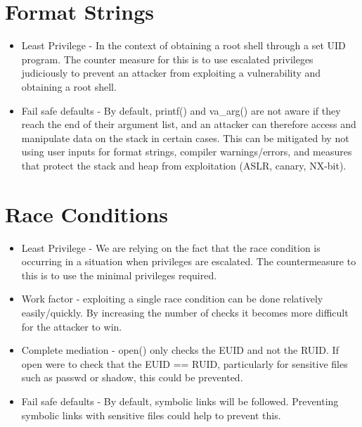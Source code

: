 \documentclass[12pt]{article}
\begin{document}
\section{Format Strings}
\begin{itemize}
\item Least Privilege - In the context of obtaining a root shell through a set UID program. The counter measure for this is to use escalated privileges judiciously to prevent an attacker from exploiting a vulnerability and obtaining a root shell.
\item Fail safe defaults - By default, printf() and va\_arg() are not aware if they reach the end of their argument list, and an attacker can therefore access and manipulate data on the stack in certain cases. This can be mitigated by not using user inputs for format strings, compiler warnings/errors, and measures that protect the stack and heap from exploitation (ASLR, canary, NX-bit).
\end{itemize}

\section{Race Conditions}
\begin{itemize}
\item Least Privilege - We are relying on the fact that the race condition is occurring in a situation when privileges are escalated. The countermeasure to this is to use the minimal privileges required.
\item Work factor - exploiting a single race condition can be done relatively easily/quickly. By increasing the number of checks it becomes more difficult for the attacker to win.
\item Complete mediation - open() only checks the EUID and not the RUID. If open were to check that the EUID == RUID, particularly for sensitive files such as passwd or shadow, this could be prevented.
\item Fail safe defaults - By default, symbolic links will be followed. Preventing symbolic links with sensitive files could help to prevent this.
\end{itemize}
\end{document}
